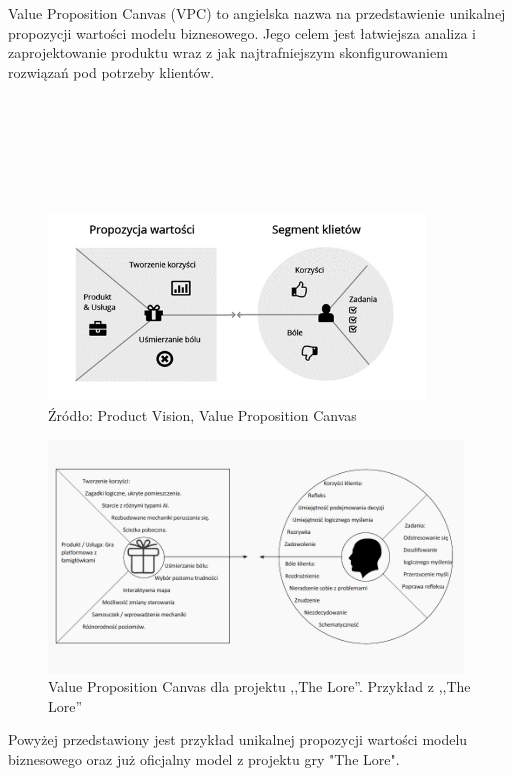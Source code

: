 \documentclass[oneside,polski,logo]{amuthesis}
\begin{document}
Value Proposition Canvas (VPC) to angielska nazwa na przedstawienie unikalnej propozycji wartości modelu biznesowego. Jego celem jest łatwiejsza analiza i zaprojektowanie  produktu wraz z jak najtrafniejszym skonfigurowaniem rozwiązań pod potrzeby klientów.\cite{VPC}\\ \\ \\ \\ \\ \\ \\

\begin{figure}[h]
	\centering
	\includegraphics[width=10cm]{images/hyps/VPC.png}
	\caption{Źródło: Product Vision, Value Proposition Canvas}
\end{figure}

\begin{figure}[h]
	\centering
	\includegraphics[width=11cm]{images/hyps/VPC-The Lore.png}
	\caption{Value Proposition Canvas dla projektu ,,The Lore''. Przykład z ,,The Lore''}
\end{figure}

Powyżej przedstawiony jest przykład unikalnej propozycji wartości modelu biznesowego oraz już oficjalny model z projektu gry "The Lore".\\ \\ \\ \\ \\ \\ \\ \\ \\ 
\end{document}
